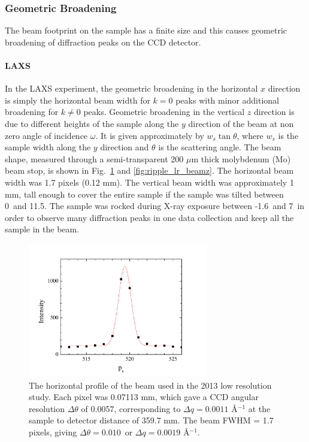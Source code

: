 \subsubsection{Geometric Broadening}
The beam footprint on the sample has a finite size and this causes
geometric broadening of diffraction peaks on the CCD detector.

\paragraph{LAXS}
In the LAXS experiment, 
the geometric broadening in the horizontal $x$ direction is simply the 
horizontal beam width for $k=0$ peaks with minor additional broadening
for $k\neq 0$ peaks. Geometric broadening in the vertical $z$ direction
is due to different heights of the sample along the $y$ direction of the beam 
at non zero angle of incidence $\omega$. It is given approximately by
$w_s\tan\theta$, where $w_s$ is the sample width along the $y$
direction and $\theta$ is the scattering angle.
The beam shape, measured through a semi-transparent 200 $\mu$m thick
molybdenum (Mo) beam stop, is shown in Fig.~\ref{fig:ripple_lr_beamx}
and \ref{fig:ripple_lr_beamz}.
The horizontal beam width was 1.7 pixels (0.12 mm). The vertical beam
width was approximately 1 mm, tall enough to cover the entire sample
if the sample was tilted between 0\textdegree\ and 11.5\textdegree. 
The sample was rocked
during X-ray exposure between -1.6\textdegree\ and 7\textdegree\ 
in order to observe many diffraction peaks in one data collection
and keep all the sample in the beam. 

\begin{figure}[p]
  \centering
  \includegraphics[width=0.7\textwidth]{figures/ripple/MMs/laxs/beamx_lr}
  \caption{The horizontal profile of the beam used in the 2013 low resolution study.
  Each pixel was 0.07113 mm, which gave a CCD angular resolution $\Delta\theta$ of 
  0.0057\textdegree, corresponding to $\Delta q=0.0011$ \AA$^{-1}$ at the 
  sample to detector distance of 359.7 mm. 
  The beam FWHM = 1.7 pixels, giving $\Delta\theta = 0.010$\textdegree\ or
  $\Delta q= 0.0019$ \AA$^{-1}$.}
  \label{fig:ripple_lr_beamx}
\end{figure}


